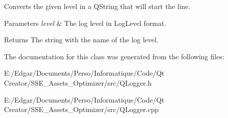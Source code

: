 Converts the given level in a Q\+String that will start the line. 


\begin{DoxyParams}{Parameters}
{\em level} & The log level in Log\+Level format. \\
\hline
\end{DoxyParams}
\begin{DoxyReturn}{Returns}
The string with the name of the log level. 
\end{DoxyReturn}


The documentation for this class was generated from the following files\+:\begin{DoxyCompactItemize}
\item 
E\+:/\+Edgar/\+Documents/\+Perso/\+Informatique/\+Code/\+Qt Creator/\+S\+S\+E\+\_\+\+Assets\+\_\+\+Optimizer/src/Q\+Logger.\+h\item 
E\+:/\+Edgar/\+Documents/\+Perso/\+Informatique/\+Code/\+Qt Creator/\+S\+S\+E\+\_\+\+Assets\+\_\+\+Optimizer/src/Q\+Logger.\+cpp\end{DoxyCompactItemize}
